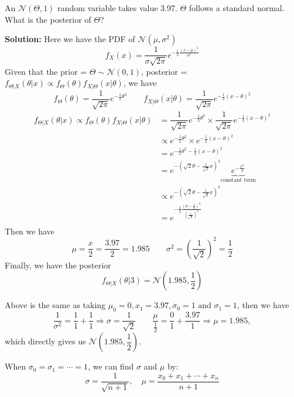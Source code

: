\begin{eg}
  An \(\mathcal{N}(\Theta, 1)\) random variable takes value 3.97. \(\Theta\) follows a standard normal. What is the posterior of \(\Theta\)?
  
  \textbf{Solution:} 
  Here we have the PDF of \(\mathcal{N} (\mu, \sigma^2)\) 
  \[
    f_X(x) = \dfrac{1}{\sigma \sqrt{2\pi}} e^{-\frac{1}{2}\frac{(x - \mu)^2}{\sigma^2}}
  \]
  Given that the prior = \(\Theta \sim \mathcal{N}(0, 1)\), posterior = \(f_{\Theta \vert X}(\theta \vert x) \propto f_{\Theta} (\theta) f_{X \vert \Theta} (x \vert \theta)\), we have
  \[
    f_{\Theta} (\theta) = \dfrac{1}{\sqrt{2\pi}}e^{-\frac{1}{2}\theta^2} \quad\quad f_{X \vert \Theta} (x \vert \theta) = \dfrac{1}{\sqrt{2\pi}}e^{-\frac{1}{2}(x - \theta)^2}
  \]
  \[
  \begin{aligned}
    f_{\Theta \vert X}(\theta \vert x) \propto f_{\Theta} (\theta) f_{X \vert \Theta} (x \vert \theta) &= \dfrac{1}{\sqrt{2\pi}}e^{-\frac{1}{2}\theta^2} \times \dfrac{1}{\sqrt{2\pi}}e^{-\frac{1}{2}(x - \theta)^2} \\
    &\propto e^{-\frac{1}{2}\theta^2} \times e^{-\frac{1}{2}(x - \theta)^2} \\
    &= e^{-\frac{1}{2}\theta^2 -\frac{1}{2}(x - \theta)^2} \\
    &= e^{-(\sqrt{2}\theta - \frac{1}{\sqrt{2}}x)^2} \underbrace{e^{-\frac{x^2}{4}}}_{\text{constant term}} \\ 
    &\propto e^{-(\sqrt{2}\theta - \frac{1}{\sqrt{2}}x)^2} \\ 
    &= e^{-\frac{1}{2}\frac{(\theta - \frac{x}{2})^2}{(\frac{1}{\sqrt{2}})^2}} \\ 
  \end{aligned}
  \]
  Then we have
  \[
    \mu = \dfrac{x}{2} = \dfrac{3.97}{2} = 1.985 \quad\quad \sigma^2 = (\dfrac{1}{\sqrt{2}})^2 = \dfrac{1}{2}
  \]
  Finally, we have the posterior
  \[
    f_{\Theta \vert X} (\theta \vert 3) = \mathcal{N} (1.985, \dfrac{1}{2})
  \]
\end{eg}

Above is the same as taking \(\mu_0 = 0, x_1 = 3.97, \sigma_0 = 1 \text{ and } \sigma_1 = 1\), then we have 
\[
  \dfrac{1}{\sigma^2} = \dfrac{1}{1} + \dfrac{1}{1} \Longrightarrow \sigma = \dfrac{1}{\sqrt{2}} \quad\quad \dfrac{\mu}{\frac{1}{2}} = \dfrac{0}{1} + \dfrac{3.97}{1} \Longrightarrow \mu = 1.985, 
\]
which directly gives us \(\mathcal{N} (1.985, \dfrac{1}{2})\). 

When \(\sigma_0 = \sigma_1 = \cdots = 1\), we can find \(\sigma\) and \(\mu\) by:
\[
  \sigma = \dfrac{1}{\sqrt{n + 1}}, \quad \mu = \dfrac{x_0 + x_1 + \cdots + x_n}{n + 1}
\] 

